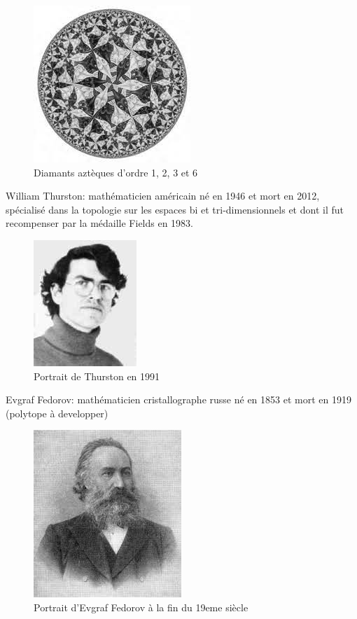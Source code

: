 \documentclass{article}
\begin{document}
\begin{figure} [!h]
    \center
    \includegraphics [scale=0.5] {image/dessin3_escher.jpg}
    \caption{Diamants aztèques d'ordre 1, 2, 3 et 6}
\end{figure}

William Thurston: mathématicien américain né en 1946 et mort en 2012, spécialisé dans la topologie sur les espaces bi et tri-dimensionnels et dont il fut recompenser par la médaille Fields en 1983.

\begin{figure} [!h]
    \center
    \includegraphics [scale=0.5] {image/thurston.jpg}
    \caption{Portrait de Thurston en 1991}
\end{figure}

Evgraf Fedorov: mathématicien cristallographe russe né en 1853 et mort en 1919 (polytope à developper)

\begin{figure} [!h]
    \center
    \includegraphics [scale=0.5] {image/Fedorov.jpg}
    \caption{Portrait d'Evgraf Fedorov à la fin du 19eme siècle}
\end{figure}

\nocite{*}

\end{document}
